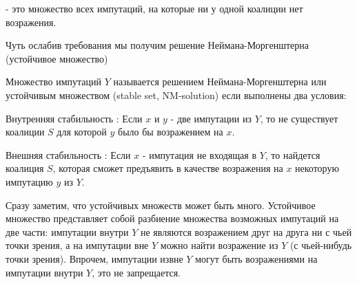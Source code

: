 \begin{mydef}
 - это множество всех импутаций, на которые ни у одной коалиции нет возражения.
\end{mydef}

Чуть ослабив требования мы получим решение Неймана-Моргенштерна (устойчивое множество)

\begin{mydef}
Множество импутаций $Y$ называется решением Неймана-Моргенштерна или устойчивым множеством   (stable set, NM-solution) если выполнены два условия:

Внутренняя стабильность : Если $x$ и $y$ - две импутации из $Y$, то не существует коалиции $S$ для которой $y$ было бы возражением на $x$.

Внешняя стабильность : Если $x$ - импутация не входящая в $Y$, то найдется коалиция $S$, которая сможет предъявить в качестве возражения на $x$ некоторую импутацию $y$ из $Y$.
\end{mydef}

Сразу заметим, что устойчивых множеств может быть много. Устойчивое множество представляет собой разбиение множества возможных импутаций на две части: импутации внутри $Y$ не являются возражением друг на друга ни с чьей точки зрения, а на импутации вне $Y$ можно найти возражение из $Y$ (с чьей-нибудь точки зрения). Впрочем, импутации извне $Y$ могут быть возражениями на импутации внутри $Y$, это не запрещается.

